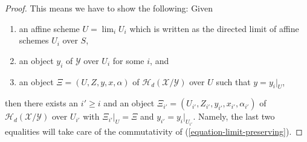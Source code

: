 \documentclass{stacks-project}
\theoremstyle{plain}
\theoremstyle{definition}
\theoremstyle{remark}
\numberwithin{equation}{subsection}
\def\lim{\mathop{\mathrm{lim}}\nolimits}
\begin{document}
\begin{proof}
This means we have to show the following: Given
\begin{enumerate}
\item an affine scheme $U = \lim_i U_i$ which is written as the
directed limit of affine schemes $U_i$ over $S$,
\item an object $y_i$ of $\mathcal{Y}$ over $U_i$ for some $i$, and
\item an object $\Xi = (U, Z, y, x, \alpha)$ of
$\mathcal{H}_d(\mathcal{X}/\mathcal{Y})$
over $U$ such that $y = y_i|_U$,
\end{enumerate}
then there exists an $i' \geq i$ and an object
$\Xi_{i'} = (U_{i'}, Z_{i'}, y_{i'}, x_{i'}, \alpha_{i'})$ of
$\mathcal{H}_d(\mathcal{X}/\mathcal{Y})$ over $U_{i'}$ with
$\Xi_{i'}|_U = \Xi$ and $y_{i'} = y_i|_{U_{i'}}$.
Namely, the last two equalities will take care of the commutativity of
(\ref{equation-limit-preserving}).


\end{proof}
\end{document}
